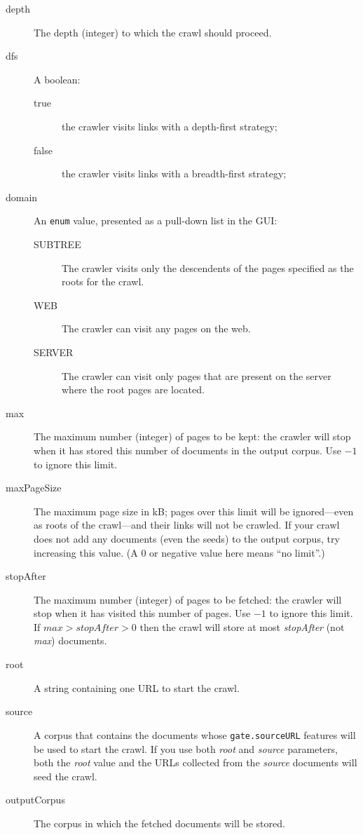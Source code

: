 \begin{description}
\item[depth] The depth (integer) to which the crawl should proceed.
\item[dfs] A boolean:
  \begin{description}
  \item[true] the crawler visits links with a depth-first strategy;
  \item[false] the crawler visits links with a breadth-first strategy;
  \end{description}
\item[domain] An \texttt{enum} value, presented as a pull-down list in the GUI:
  \begin{description}
  \item[SUBTREE] The crawler visits only the descendents of the pages
    specified as the roots for the crawl.
  \item[WEB] The crawler can visit any pages on the web.
  \item[SERVER] The crawler can visit only pages that are present on the
    server where the root pages are located.
  \end{description}
\item[max] The maximum number (integer) of pages to be kept: the crawler will
  stop when it has stored this number of documents in the output corpus.  Use
  $-1$ to ignore this limit.
\item[maxPageSize] The maximum page size in kB; pages over this limit will be
  ignored---even as roots of the crawl---and their links will not be crawled.
  If your crawl does not add any documents (even the seeds) to the output
  corpus, try increasing this value.  (A 0 or negative value here means ``no
  limit''.)
\item[stopAfter] The maximum number (integer) of pages to be fetched: the
  crawler will stop when it has visited this number of pages.  Use $-1$ to
  ignore this limit.  If $\mathit{max} > \mathit{stopAfter} > 0$ then the
  crawl will store at most \emph{stopAfter} (not \emph{max}) documents.
\item[root] A string containing one URL to start the crawl.
\item[source] A corpus that contains the documents whose
  \texttt{gate.sourceURL} features will be used to start the crawl.  If you
  use both \emph{root} and \emph{source} parameters, both the \emph{root}
  value and the URLs collected from the \emph{source} documents will seed the
  crawl.
\item[outputCorpus] The corpus in which the fetched documents will be stored.

\end{description}
